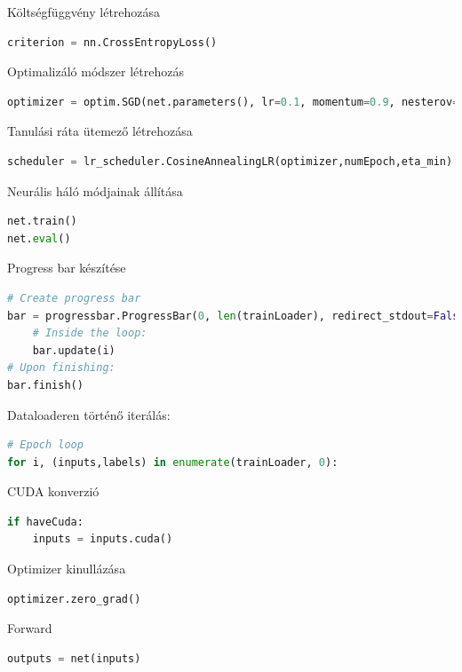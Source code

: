 \documentclass[12pt,a4paper,oneside]{report}             %
\begin{document}
Költségfüggvény létrehozása

\begin{lstlisting}[language=Python]
criterion = nn.CrossEntropyLoss()
\end{lstlisting}

Optimalizáló módszer létrehozás

\begin{lstlisting}[language=Python]
optimizer = optim.SGD(net.parameters(), lr=0.1, momentum=0.9, nesterov=True, weight_decay=1e-4)
\end{lstlisting}

Tanulási ráta ütemező létrehozása

\begin{lstlisting}[language=Python]
scheduler = lr_scheduler.CosineAnnealingLR(optimizer,numEpoch,eta_min)
\end{lstlisting}

Neurális háló módjainak állítása

\begin{lstlisting}[language=Python]
net.train()
net.eval()
\end{lstlisting}

Progress bar készítése

\begin{lstlisting}[language=Python]
# Create progress bar
bar = progressbar.ProgressBar(0, len(trainLoader), redirect_stdout=False)
	# Inside the loop:
	bar.update(i)
# Upon finishing:
bar.finish()
\end{lstlisting}

Dataloaderen történő iterálás:

\begin{lstlisting}[language=Python]
# Epoch loop
for i, (inputs,labels) in enumerate(trainLoader, 0):
\end{lstlisting}

CUDA konverzió

\begin{lstlisting}[language=Python]
if haveCuda:
	inputs = inputs.cuda()
\end{lstlisting}
	
Optimizer kinullázása
	
\begin{lstlisting}[language=Python]
optimizer.zero_grad()
\end{lstlisting}
	
Forward

\begin{lstlisting}[language=Python]
outputs = net(inputs)
\end{lstlisting}
\end{document}
